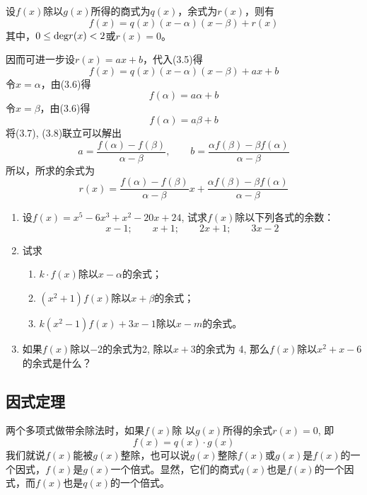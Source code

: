 \begin{solution}
设$f(x)$除以$g(x)$所得的商式为$q(x)$，余式为$r(x)$，则有
\begin{equation}
f(x)=q(x)(x-\alpha)(x-\beta)+r(x)
\end{equation}
    其中，$0\le {\rm deg}r(x)<2$或$r(x)=0$。

因而可进一步设$r(x)=ax+b$，代入(3.5)得
\begin{equation}
    f(x)=q(x)(x-\alpha)(x-\beta)+ax+b
\end{equation}
令$x=\alpha$，由(3.6)得
\begin{equation}
    f(\alpha)=a\alpha+b
\end{equation}
令$x=\beta$，由(3.6)得
\begin{equation}
    f(\alpha)=a\beta+b
\end{equation}
将(3.7), (3.8)联立可以解出
\[a=\frac{f(\alpha)-f(\beta)}{\alpha-\beta},\qquad b=\frac{\alpha f(\beta)-\beta f(\alpha)}{\alpha-\beta}\]
所以，所求的余式为
\[r(x)=\frac{f(\alpha)-f(\beta)}{\alpha-\beta}x+\frac{\alpha f(\beta)-\beta f(\alpha)}{\alpha-\beta}\]
\end{solution}

\begin{ex}
\begin{enumerate}
\item 设$f(x)=x^5-6x^3+x^2-20x+24$, 试求$f(x)$除以下列各式的余数：
\[x-1;\qquad  x+1;\qquad  2x+1;\qquad  3x-2\]
\item 试求
\begin{enumerate}
\item $k\cdot f(x)$除以$x-\alpha$的余式；
\item $(x^2+1)f(x)$除以$x+\beta$的余式；
\item $k(x^2-1)f(x)+3x-1$除以$x-m$的余式。
\end{enumerate}

\item 如果$f(x)$除以$-2$的余式为2, 除以$x+3$的余式为
4, 那么$f(x)$除以$x^2+x-6$的余式是什么？
\end{enumerate}
\end{ex}



\subsection{因式定理}

两个多项式做带余除法时，如果$f(x)$除
以$g(x)$所得的余式$r(x)=0$, 即
\[f (x) =q (x) \cdot g (x) \]
我们就说$f(x)$能被$g(x)$整除，也可以说$g(x)$整除$f(x)$或$g(x)$是$f(x)$的一个因式，$f(x)$是$g(x)$一个倍式。显然，它们的商式$q(x)$也是$f(x)$的一个因式，而$f(x)$也是$q(x)$的一个倍式。

